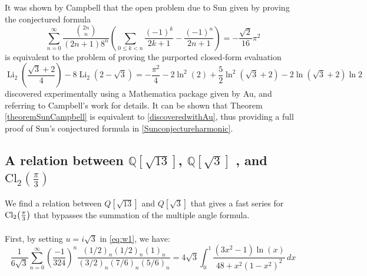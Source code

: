 \documentclass[12pt]{article}
\begin{document}
\noindent  It was shown by Campbell \cite{Campbell2023} that the open problem due to Sun \cite{Sun2021,Sun2015} given by proving the 
 conjectured formula 
\begin{equation}\label{Sunconjectureharmonic}
 \sum_{n=0}^{\infty} \frac{ \binom{2n}{n} }{ (2n+1) 8^{n} } \left( \sum_{0 \leq k < n} 
 \frac{(-1)^k}{2k+1} - \frac{(-1)^n}{2n+1} \right) = -\frac{\sqrt{2}}{16} \pi^2 
\end{equation}
 is equivalent to the problem of proving the purported closed-form evaluation 
\begin{equation}\label{discoveredwithAu}
 \operatorname{Li}_{2}\left( \frac{\sqrt{3} + 2}{4} \right) - 8 \operatorname{Li}_{2}(2 - \sqrt{3}) 
 = -\frac{\pi^2}{4} - 2 \ln^{2}(2) + \frac{5}{2} \ln^2(\sqrt{3} + 2) - 2 \ln(\sqrt{3} + 2) \ln 2 
\end{equation}
 discovered experimentally using a Mathematica package given by Au, and referring to Campbell's work \cite{Campbell2023} for details. 
 It can be shown that Theorem \ref{theoremSunCampbell} is equivalent to \eqref{discoveredwithAu}, thus providing a full proof of Sun's 
 conjectured formula in \eqref{Sunconjectureharmonic}. 

\subsection{A relation between $\mathbb{Q}[\sqrt{13}]$,  $\mathbb{Q}[\sqrt{3}]$ , and $\mathrm{Cl}_2\!\left(\tfrac{\pi}{3}\right)$}\label{subsec:sqrt13cl2}

We find  a relation between ${Q}[\sqrt{13}]$ and ${Q}[\sqrt{3}]$ that gives a fast series for $\rm{Cl}_2\big(\tfrac{\pi}3\big)$ that bypasses the summation of the multiple angle formula.  
\\
\\
First, by setting $u=  i\sqrt{3}$ in \eqref{eq:w1}, we have:
\begin{equation}\label{eq:u-isqrt3}
\frac{1}{6\sqrt{3}}\sum_{n=0}^{\infty}  \left(  \frac{-1}{324}  \right)^{n} \frac{ (1/2)_n(1/2)_n(1)_n}{(3/2)_n(7/6)_n(5/6)_n}   =4 \sqrt{3} \int_{0}^{1} \frac{(3x^2 - 1)\ln(x)}{48 + x^2(1 - x^2)^2} \, dx
\end{equation}
\end{document}
